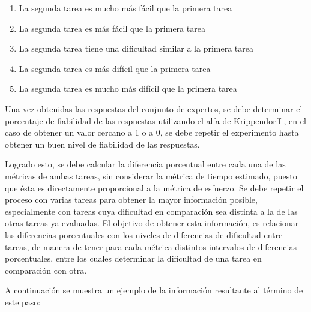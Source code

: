 \documentclass[letterpaper,12pt]{article}
\begin{document}
\begin{enumerate}
  \item La segunda tarea es mucho más fácil que la primera tarea
  \item La segunda tarea es más fácil que la primera tarea
  \item La segunda tarea tiene una dificultad similar a la primera tarea
  \item La segunda tarea es más difícil que la primera tarea
  \item La segunda tarea es mucho más difícil que la primera tarea
\end{enumerate}

Una vez obtenidas las respuestas del conjunto de expertos, se debe determinar el porcentaje de fiabilidad de las respuestas utilizando el alfa de Krippendorff \cite{alpha-reliability-krippendorff}, en el caso de obtener un valor cercano a 1 o a 0, se debe repetir el experimento hasta obtener un buen nivel de fiabilidad de las respuestas.

Logrado esto, se debe calcular la diferencia porcentual entre cada una de las métricas de ambas tareas, sin considerar la métrica de tiempo estimado, puesto que ésta es directamente proporcional a la métrica de esfuerzo. Se debe repetir el proceso con varias tareas para obtener la mayor información posible, especialmente con tareas cuya dificultad en comparación sea distinta a la de las otras tareas ya evaluadas. El objetivo de obtener esta información, es relacionar las diferencias porcentuales con los niveles de diferencias de dificultad entre tareas, de manera de tener para cada métrica distintos intervalos de diferencias porcentuales, entre los cuales determinar la dificultad de una tarea en comparación con otra.

A continuación se muestra un ejemplo de la información resultante al término de este paso:
\end{document}
